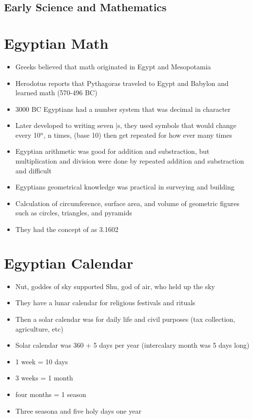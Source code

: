 \documentclass{article}
\begin{document}
\subsection{Early Science and Mathematics}

\section*{Egyptian Math}
\begin{itemize}
  \item Greeks believed that math originated in Egypt and Mesopotamia
  \item Herodotus reports that Pythagoras traveled to Egypt and Babylon and learned math (570-496 BC)
  \item 3000 BC Egyptians had a number system that was decimal in character
  \item Later developed to writing seven |s, they used symbols that would change every 10$^n$, n times, (base 10)
    then get repeated for how ever many times
  \item Egyptian arithmetic was good for addition and substraction, but multiplication and division
    were done by repeated addition and substraction and difficult
  \item Egyptians geometrical knowledge was practical in surveying and building
  \item Calculation of circumference, surface area, and volume of geometric figures
    such as circles, triangles, and pyramids
  \item They had the concept of \pi{} as 3.1602
\end{itemize}

\section*{Egyptian Calendar}
\begin{itemize}
  \item Nut, goddes of sky supported Shu, god of air, who held up the sky
  \item They have a lunar calendar for religious festivals and rituals
  \item Then a solar calendar was for daily life and civil purposes (tax collection, agriculture, etc)
  \item Solar calendar was 360 + 5 days per year (intercalary month was 5 days long)
  \item 1 week = 10 days
  \item 3 weeks = 1 month
  \item four months = 1 season
  \item Three seasona and five holy days one year
\end{itemize}
\end{document}
